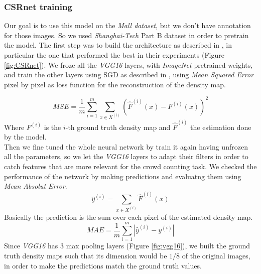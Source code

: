 \documentclass[10pt,twocolumn,letterpaper]{article}
\begin{document}
\subsubsection{CSRnet training}
Our goal is to use this model on the \textit{Mall dataset}, but we don't have annotation for those images. So we used \textit{Shanghai-Tech} Part B dataset in order to pretrain the model. The first step was to build the architecture as described in \cite{li2018csrnet}, in particular the one that performed the best in their experiments (Figure \ref{fig:CSRnet}). We froze all the \textit{VGG16} layers, with \textit{ImageNet} pretrained weights, and train the other layers using SGD as described in \cite{li2018csrnet}, using \textit{Mean Squared Error} pixel by pixel as loss function for the reconstruction of the density map.

\begin{equation}
	MSE = \frac{1}{m}  \sum_{i = 1}^{m} \sum_{x \in X^{(i)}} (\hat{F}^{(i)}(x) - F^{(i)}(x))^2 \label{eq:MAE}
\end{equation}
Where $F^{(i)}$ is the $i$-th ground truth density map and $\hat{F}^{(i)}$ the estimation done by the model.\\
 Then we fine tuned the whole neural network by train it again having unfrozen all the parameters, so we let the \textit{VGG16} layers to adapt their filters in order to catch features that are more relevant for the crowd counting task. We checked the performance of the network by making predictions and evaluatng them using \textit{Mean Absolut Error}.
\begin{equation}
	\hat{y}^{(i)} = \sum_{x \in X^{(i)}}\hat{F}^{(i)}(x)
\end{equation}
Basically the prediction is the sum over each pixel of the estimated density map.
\begin{equation}
	MAE = \frac{1}{m}  \sum_{i = 1}^{m} |\hat{y}^{(i)} - y^{(i)}|\label{eq:MAE}
\end{equation}
Since \textit{VGG16} has 3 max pooling layers (Figure \ref{fig:vgg16}), we built the ground truth density maps such that its dimension would be $1/8$ of the original images, in order to make the predictions match the ground truth values.
\end{document}
